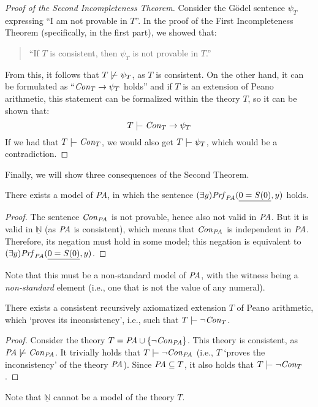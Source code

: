     \begin{proof}[Proof of the Second Incompleteness Theorem]
    Consider the Gödel sentence $\psi_T$ expressing ``I am not provable in $T$''. In the proof of the First Incompleteness Theorem (specifically, in the first part), we showed that:
    \begin{quote}
        ``If $T$ is consistent, then $\psi_T$ is not provable in $T$.''
    \end{quote}
    From this, it follows that $T\not\proves\psi_T$, as $T$ is consistent. On the other hand, it can be formulated as ``$\mathit{Con}_T\to \psi_T$ holds'' and if $T$ is an extension of Peano arithmetic, this statement can be formalized within the theory $T$, so it can be shown that:
    $$
    T\proves\Con_T\to\psi_T
    $$
    If we had that $T\proves\Con_T$, we would also get $T\proves\psi_T$, which would be a contradiction.
    \end{proof}
    
    Finally, we will show three consequences of the Second Theorem.
    
    \begin{corollary}
        There exists a model of {\it PA}, in which the sentence $(\exists y)\mathit{Prf}_{\text{\it PA}}(\underline{0=S(0)},y)$ holds.
    \end{corollary}
    \begin{proof}
        The sentence $\mathit{Con}_{\text{\it PA}}$ is not provable, hence also not valid in $\text{\it PA}$. But it is valid in $\underline{\mathbb N}$ (as $\text{\it PA}$ is consistent), which means that $\mathit{Con}_{\text{\it PA}}$ is independent in $\text{\it PA}$. Therefore, its negation must hold in some model; this negation is equivalent to $(\exists y)\mathit{Prf}_{\text{\it PA}}(\underline{0=S(0)},y)$.
            
    \end{proof}
    Note that this must be a non-standard model of $\text{\it PA}$, with the witness being a \emph{non-standard} element (i.e., one that is not the value of any numeral).
    
    \begin{corollary}
        There exists a consistent recursively axiomatized extension $T$ of Peano arithmetic, which `proves its inconsistency', i.e., such that $T\proves \neg \Con_T$.
    \end{corollary}
    \begin{proof}
    Consider the theory $T=\text{\it PA} \cup \{\neg \mathit{Con}_{\text{\it PA}}\}$. This theory is consistent, as $\text{\it PA}\not\proves\Con_{\text{\it PA}}$. It trivially holds that $T\proves\neg\Con_{\text{\it PA}}$ (i.e., $T$ `proves the inconsistency' of the theory $\text{\it PA}$). Since $\text{\it PA}\subseteq T$, it also holds that $T\proves\neg\Con_T$.
    \end{proof}
    Note that $\underline{\mathbb{N}}$ cannot be a model of the theory $T$.
    
